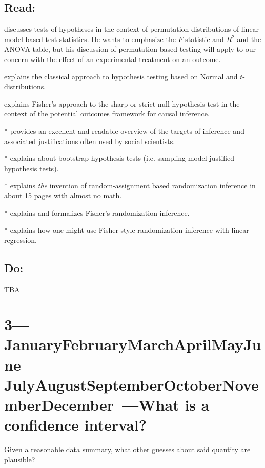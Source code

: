 \documentclass[10pt]{article}
\def\themonth{\ifcase\month\or
  January\or February\or March\or April\or May\or June\or
  July\or August\or September\or October\or November\or December\fi}
\begin{document}
\subsection{Read:}
\citealp[Chap 15,16.1,16.6,16.7,17.5,17.7,17.8]{kaplan2009ism} discusses tests of hypotheses in the
context of permutation distributions of linear model based test
statistics. He wants to emphasize the $F$-statistic and $R^2$ and the
ANOVA table, but his discussion of permutation based testing will
apply to our concern with the effect of an experimental treatment on an outcome.

\citealp[Chap 8]{gonick1993cgs} explains the classical approach to
hypothesis testing based on Normal and $t$-distributions.

\citealp[Chap 5]{imbens2009causal} explains Fisher's approach to the
sharp or strict null hypothesis test in the context of the potential
outcomes framework for causal inference.

*\citealp[Chap 4]{berk04} provides an excellent and readable overview
of the targets of inference and associated justifications often used
by social scientists.

*\citealp[Chap 21.4]{fox2008applied} explains about bootstrap hypothesis tests
(i.e. sampling model justified hypothesis tests).  

*\citealp[Chap 2]{fisher:1935} explains \emph{the} invention of
random-assignment based randomization inference in about 15 pages with
almost no math.

*\citealp[Chap 2--2.4]{rosenbaum:2002} explains and formalizes Fisher's randomization inference.

*\citealp{rosenbaum:2002a} explains how one might use Fisher-style
randomization inference with linear regression.

\subsection{Do:} TBA

\AdvanceDate[7]
\section{3---\themonth~\the\day---What is a confidence interval? }
Given a reasonable data summary, what other guesses about said
quantity are plausible?
\end{document}
